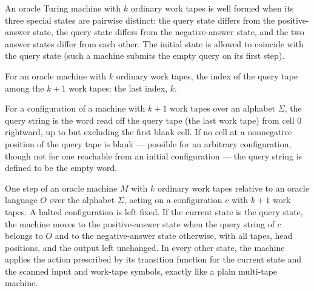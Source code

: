 \begin{definition}
\label{Turing.OracleTM.WellFormed}
\leanok
{}
An oracle Turing machine with $k$ ordinary work tapes is well formed when its
three special states are pairwise distinct: the query state differs from the
positive-answer state, the query state differs from the negative-answer state,
and the two answer states differ from each other.  The initial state is
allowed to coincide with the query state (such a machine submits the empty
query on its first step).
\end{definition}

\begin{definition}
\label{Turing.OracleTM.queryTapeIdx}
\leanok
For an oracle machine with $k$ ordinary work tapes, the index of the query
tape among the $k+1$ work tapes: the last index, $k$.
\end{definition}

\begin{definition}
\label{Turing.OracleTM.queryString}
\leanok
{}
For a configuration of a machine with $k+1$ work tapes over an alphabet
$\Sigma$, the query string is the word read off the query tape (the last work
tape) from cell $0$ rightward, up to but excluding the first blank cell.  If
no cell at a nonnegative position of the query tape is blank --- possible for
an arbitrary configuration, though not for one reachable from an initial
configuration --- the query string is defined to be the empty word.
\end{definition}

\begin{definition}
\label{Turing.OracleTM.step}
\leanok
{}
One step of an oracle machine $M$ with $k$ ordinary work tapes relative to an
oracle language $O$ over the alphabet $\Sigma$, acting on a configuration $c$
with $k+1$ work tapes.  A halted configuration is left fixed.  If the current
state is the query state, the machine moves to the positive-answer state when
the query string of $c$ belongs to $O$ and to the negative-answer state
otherwise, with all tapes, head positions, and the output left unchanged.  In
every other state, the machine applies the action prescribed by its transition
function for the current state and the scanned input and work-tape symbols,
exactly like a plain multi-tape machine.
\end{definition}

